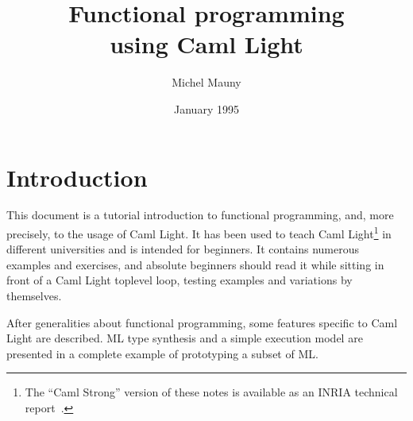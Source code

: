 \title{Functional programming \\ using Caml Light}
\author{Michel Mauny}
\date{January 1995}

\emergencystretch=50pt  %
\setcounter{tocdepth}{1}        %
\def\CAMLVERSION{0.7}
\newtheorem{exoth}{Exercise}[chapter]
\def\exo{\begin{exoth}\ifx\exofont\undefined\else\exofont\fi}
\def\endexo{\end{exoth}}
\def\Example{\paragraph{Example}}
\def\End{\par\noindent$\Box$\par}
\def\ikwd#1{}



\maketitle

\cleardoublepage

\tableofcontents

\chapter{Introduction}

This document is a tutorial introduction to functional programming, and,
more precisely, to the usage of Caml Light.  It has been used to teach
Caml Light\footnote{The ``Caml Strong'' version of these notes is available
as an INRIA technical report~\cite{BDC}.} in different universities
and is intended for beginners. It contains numerous examples and
exercises, and absolute beginners should read it while sitting in
front of a Caml Light toplevel loop, testing examples and variations
by themselves.

After generalities about functional programming, some features
specific to Caml Light are described. ML type synthesis and a simple
execution model are presented in a complete example of prototyping a
subset of ML.

